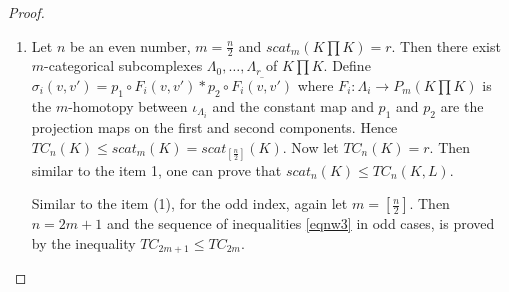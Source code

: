 \documentclass[preprint,11pt %
]{hjm1}
\theoremstyle{definition}
\begin{document}
\begin{proof}
\begin{enumerate}
\item
Let $n$ be an even number, $m = \frac{n}{2}$ and   $scat_m(K \prod K) = r$. Then there exist $m$-categorical subcomplexes $\Lambda_0, \ldots, \Lambda_r$ of $K \prod K$. Define $\sigma_i (v,v')= p_1 \circ F_i (v, v') * p_2 \circ \overline{F_i (v,v')}$ where $F_i: \Lambda_i \to P_m( K \prod K)$ is the $m$-homotopy between $\iota_{\Lambda_i}$ and the constant map         and $p_1$ and $p_2$ are the projection maps on the first and second components.  
Hence $TC_{n} (K) \le scat_m(K) = scat_{[\frac{n}{2}]} (K)$. 
Now let $TC_{n} (K) =r$. Then similar to the item 1, one can prove that $scat_{n} (K) \le TC_{n} (K,L)$.

Similar to the item (1), for the odd index, again let $m = [\frac{n}{2}]$. Then $n = 2m +1$ and  the sequence of inequalities \eqref{eqnw3} in odd cases, is proved by the inequality  $TC_{2m +1} \le TC_{2m}$.




 
\end{enumerate}
\end{proof}
\end{document}
